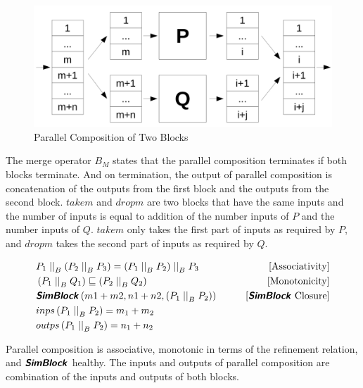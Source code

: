 \begin{figure}[htb]
    \begin{center}
        \includegraphics[scale=0.45]{parallel}
    \end{center}
    \caption{Parallel Composition of Two Blocks}
    \label{fig:parallel}
\end{figure}

The merge operator $B_M$ states that the parallel composition terminates if both blocks terminate. And on termination, the output of parallel composition is concatenation of the outputs from the first block and the outputs from the second block. $takem$ and $dropm$ are two blocks that have the same inputs and the number of inputs is equal to addition of the number inputs of $P$ and the number inputs of $Q$. $takem$ only takes the first part of inputs as required by $P$, and $dropm$ takes the second part of inputs as required by $Q$.

\begin{theorem}
    \begin{align*}
        & P_1 \parallel_B \left(P_2 \parallel_B P_3\right) = \left(P_1 \parallel_B P_2\right) \parallel_B P_3 & \tag*{[Associativity]} \\
        & \left(P_1 \parallel_B Q_1\right) \refinedby \left(P_2 \parallel_B Q_2\right) & \tag*{[Monotonicity]} \\ 
        & \healthy{SimBlock}\left(m1+m2, n1+n2, \left(P_1 \parallel_B P_2\right)\right) & \tag*{[\healthy{SimBlock} Closure]} \\ 
        & inps\left(P_1 \parallel_B P_2\right) = m_1 + m_2 & \tag*{} \\
        & outps\left(P_1 \parallel_B P_2\right) = n_1 + n_2 & \tag*{}
    \end{align*}
    \label{thm:parallelB}
\end{theorem}

Parallel composition is associative, monotonic in terms of the refinement relation, and $\hbox{\textbf{\textsf{\textsl{SimBlock}}}}$ healthy. The inputs and outputs of parallel composition are combination of the inputs and outputs of both blocks.

